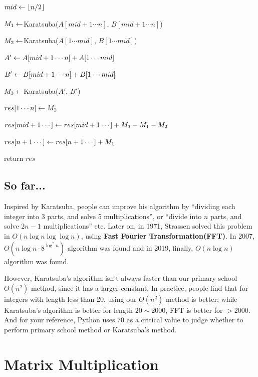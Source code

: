 \documentclass[11pt, a4paper]{COMP3711}
\begin{document}
\begin{spacing}{1.5}
\begin{algorithm}

        $mid\leftarrow \lfloor n/2 \rfloor$

        $M_1\leftarrow $Karatsuba($A[mid+1\cdots n]$, $B[mid+1\cdots n]$)
        \qquad {}

        $M_2\leftarrow $Karatsuba($A[1\cdots mid]$, $B[1\cdots mid]$)
        \qquad {}

        $A'\leftarrow A[mid+1\cdots n]+A[1\cdots mid]$

        $B'\leftarrow B[mid+1\cdots n]+B[1\cdots mid]$

        $M_3\leftarrow $Karatsuba($A'$, $B'$)
        \qquad {}


        $res[1\cdots n]\leftarrow M_2$

        $res[mid+1\cdots ]\leftarrow res[mid+1\cdots] +M_3-M_1-M_2$

        $res[n+1\cdots]\leftarrow res[n+1\cdots]+M_1$

        return $res$
    \end{algorithm}

    \subsection{So far...}

    Inspired by Karatsuba, people can improve his algorithm by 
    ``dividing each integer into 3 parts, and solve 5 multiplications'',
    or ``divide into $n$ parts, and solve $2n-1$ multiplications'' etc.
    Later on, in 1971, Strassen solved this problem in 
    $O(n\log n\log \log n)$, using {\bf Fast Fourier Transformation(FFT)}.
    In 2007, $O(n\log n\cdot 8^{\log ^* n})$ algorithm was found 
    and in 2019, finally, $O(n\log n)$ algorithm was found.

    However, Karatsuba's algorithm isn't always faster than 
    our primary school $O(n^2)$ method, since it has a larger 
    constant. In practice, people find that for integers with
    length less than 20, using our $O(n^2)$ method is better;
    while Karatsuba's algorithm is better for length $20\sim 2000$,
    FFT is better for $>2000$. And for your reference, Python 
    uses 70 as a critical value to judge whether to perform 
    primary school method or Karatsuba's method.

    \section{Matrix Multiplication}


\end{spacing}
\end{document}
